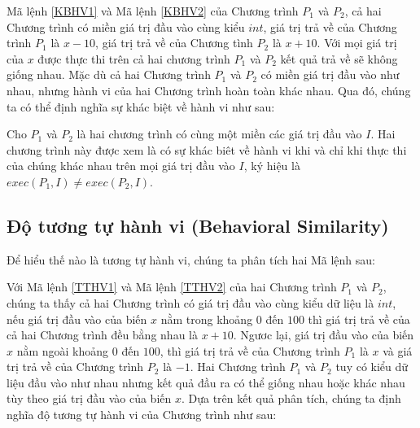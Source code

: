 Mã lệnh \ref{KBHV1} và Mã lệnh \ref{KBHV2}  của Chương trình $P_{1}$ và $P_{2}$, cả hai Chương trình có miền giá trị đầu vào cùng kiểu $int$, giá trị trả về của Chương trình $P_{1}$ là $x - 10$, giá trị trả về của Chương tình $P_{2}$ là $x + 10$. Với mọi giá trị của $x$ được thực thi trên cả hai chương trình $P_{1}$ và $P_{2}$ kết quả trả về sẽ không giống nhau. Mặc dù cả hai Chương trình $P_{1}$ và $P_{2}$ có miền giá trị đầu vào như nhau, nhưng hành vi của hai Chương trình hoàn toàn khác nhau. Qua đó, chúng ta có thể định nghĩa sự khác biệt về hành vi như sau:

\begin{definition}
Cho $P_{1}$ và $P_{2}$ là hai chương trình có cùng một miền các giá trị đầu vào $I$. Hai chương trình này được xem là có sự khác biêt về hành vi khi và chỉ khi thực thi của chúng khác nhau trên mọi giá trị đầu vào $I$, ký hiệu là $exec(P_{1}, I) \neq exec(P_{2}, I)$.
\end{definition}

\subsection{Độ tương tự hành vi (Behavioral Similarity)}
Để hiểu thế nào là tương tự hành vi, chúng ta phân tích hai Mã lệnh sau:

\begin{minipage}[t]{0.45\linewidth}
	
\end{minipage}%
\hfill\vrule\hfill
\begin{minipage}[t]{0.45\linewidth}
	
\end{minipage}%

Với Mã lệnh \ref{TTHV1} và Mã lệnh \ref{TTHV2} của hai Chương trình $P_{1}$ và $P_{2}$, chúng ta thấy cả hai Chương trình có giá trị đầu vào cùng kiểu dữ liệu là $int$, nếu giá trị đầu vào của biến $x$ nằm trong khoảng $0$ đến $100$ thì giá trị trả về của cả hai Chương trình đều bằng nhau là $x+10$. Ngươc lại, giá trị đầu vào của biến $x$ nằm ngoài khoảng $0$ đến $100$, thì giá trị trả về của Chương trình $P_{1}$ là $x$ và giá trị trả về của Chương trình $P_{2}$ là $-1$. Hai Chương trình $P_{1}$ và $P_{2}$ tuy có kiểu dữ liệu đầu vào như nhau nhưng kết quả đầu ra có thể giống nhau hoặc khác nhau tùy theo giá trị đầu vào của biến $x$. Dựa trên kết quả phân tích, chúng ta định nghĩa độ tương tự hành vi của Chương trình như sau:

